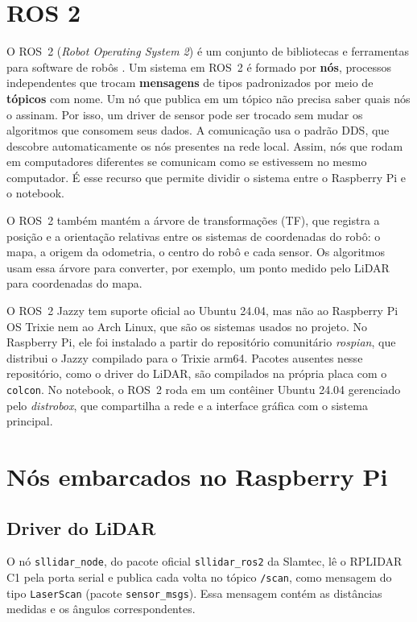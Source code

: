 \section{ROS 2}
\label{sec:ros}

O ROS~2 (\textit{Robot Operating System 2}) é um conjunto de bibliotecas
e ferramentas para software de robôs \cite{macenski2022ros2}. Um sistema
em ROS~2 é formado por \textbf{nós}, processos independentes que trocam
\textbf{mensagens} de tipos padronizados por meio de \textbf{tópicos} com
nome. Um nó que publica em um tópico não precisa saber quais nós o
assinam. Por isso, um driver de sensor pode ser trocado sem mudar os
algoritmos que consomem seus dados. A comunicação usa o padrão DDS, que
descobre automaticamente os nós presentes na rede local. Assim, nós que
rodam em computadores diferentes se comunicam como se estivessem no mesmo
computador. É esse recurso que permite dividir o sistema entre o
Raspberry Pi e o notebook.

O ROS~2 também mantém a árvore de transformações (TF), que registra a
posição e a orientação relativas entre os sistemas de coordenadas do
robô: o mapa, a origem da odometria, o centro do robô e cada sensor. Os
algoritmos usam essa árvore para converter, por exemplo, um ponto medido
pelo LiDAR para coordenadas do mapa.

O ROS~2 Jazzy tem suporte oficial ao Ubuntu 24.04, mas não ao Raspberry Pi
OS Trixie nem ao Arch Linux, que são os sistemas usados no projeto. No
Raspberry Pi, ele foi instalado a partir do repositório comunitário
\textit{rospian}, que distribui o Jazzy compilado para o Trixie arm64.
Pacotes ausentes nesse repositório, como o driver do LiDAR, são compilados
na própria placa com o \texttt{colcon}. No notebook, o ROS~2 roda em um
contêiner Ubuntu 24.04 gerenciado pelo \textit{distrobox}, que compartilha
a rede e a interface gráfica com o sistema principal.

\section{Nós embarcados no Raspberry Pi}

\subsection{Driver do LiDAR}

O nó \texttt{sllidar\_node}, do pacote oficial \texttt{sllidar\_ros2} da
Slamtec, lê o RPLIDAR C1 pela porta serial e publica cada volta no tópico
\texttt{/scan}, como mensagem do tipo \texttt{LaserScan} (pacote
\texttt{sensor\_msgs}). Essa mensagem contém as distâncias medidas e os ângulos correspondentes.

